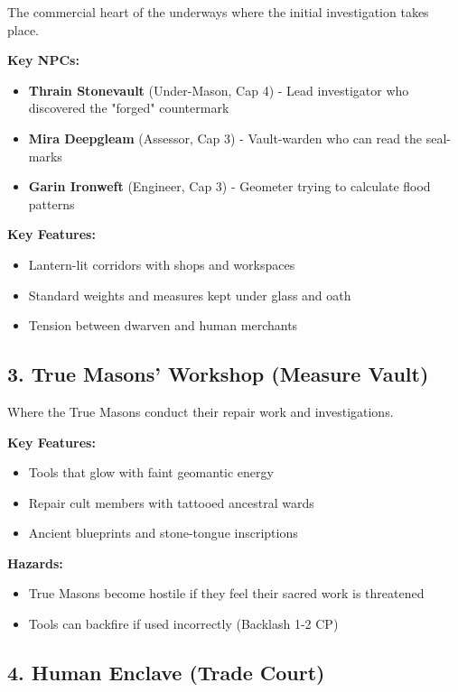 \documentclass[11pt]{article}
\begin{document}
The commercial heart of the underways where the initial investigation takes place.

\textbf{Key NPCs:}
\begin{itemize}
\item \textbf{Thrain Stonevault} (Under-Mason, Cap 4) - Lead investigator who discovered the "forged" countermark
\item \textbf{Mira Deepgleam} (Assessor, Cap 3) - Vault-warden who can read the seal-marks
\item \textbf{Garin Ironweft} (Engineer, Cap 3) - Geometer trying to calculate flood patterns
\end{itemize}

\textbf{Key Features:}
\begin{itemize}
\item Lantern-lit corridors with shops and workspaces
\item Standard weights and measures kept under glass and oath
\item Tension between dwarven and human merchants
\end{itemize}

\subsection{3. True Masons' Workshop (Measure Vault)}

Where the True Masons conduct their repair work and investigations.

\textbf{Key Features:}
\begin{itemize}
\item Tools that glow with faint geomantic energy
\item Repair cult members with tattooed ancestral wards
\item Ancient blueprints and stone-tongue inscriptions
\end{itemize}

\textbf{Hazards:}
\begin{itemize}
\item True Masons become hostile if they feel their sacred work is threatened
\item Tools can backfire if used incorrectly (Backlash 1-2 CP)
\end{itemize}

\subsection{4. Human Enclave (Trade Court)}
\end{document}
